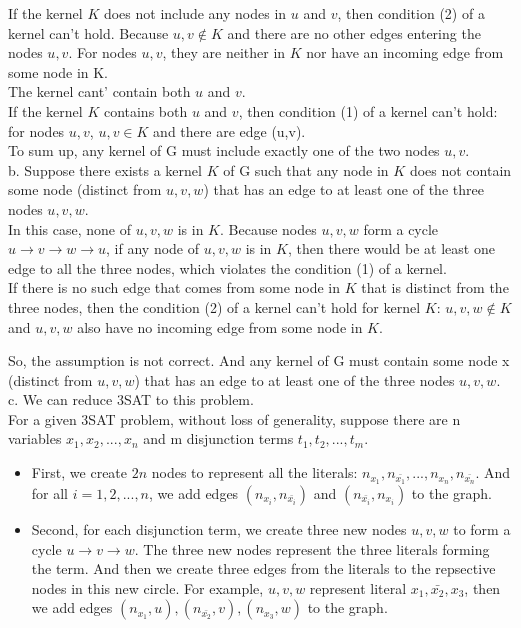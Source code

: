 \documentclass[12pt]{article}
\begin{document}
If the kernel $K$ does not include any nodes in $u$ and $v$, then
condition (2) of a kernel can't hold. Because $u,v \notin K$ and there are no
other edges entering the nodes $u, v$. For nodes $u, v$, they are
neither in $K$ nor have an incoming edge from some node in K. \\

The kernel cant' contain both $u$ and $v$. \\

If the kernel $K$ contains both $u$ and $v$, then condition (1) of a
kernel can't hold: for nodes $u, v$, $u,v \in K$ and there are edge
(u,v). \\ 

To sum up, any kernel of G must include exactly one of the two nodes
$u,v$. \\

b. Suppose there exists a kernel $K$ of G such that any node in $K$
does not contain some node (distinct from $u, v, w$) that has an edge
to at least one of the three nodes $u, v, w$. \\ 

In this case, none of $u, v, w$ is in $K$. Because nodes $u, v, w$
form a cycle $u \to v \to w \to u$, if any node of $u, v, w$ is in
$K$, then there would be at least one edge to all the three nodes,
which violates the condition (1) of a kernel. \\ 

If there is no such edge that comes from some node in $K$ that is
distinct from the three nodes, then the condition (2) of a kernel
can't hold for kernel $K$: $u, v, w \notin K$ and $u, v, w$ also have
no incoming edge from some node in $K$.  

So, the assumption is not correct. And any kernel of G must contain
some node x (distinct from $u, v, w$) that has an edge to at least one
of the three nodes $u, v, w$. \\ 

c. We can reduce 3SAT to this problem. \\

For a given 3SAT problem, without loss of generality, suppose there
are n variables $x_1, x_2, ..., x_n$ and m disjunction terms $t_1,
t_2, ..., t_m$. 

\begin{itemize}
\item First, we create $2n$ nodes to represent all the literals:
  $n_{x_1}, n_{\bar {x_1}}, ..., n_{x_n}, n_{\bar {x_n}}$. And for all
  $i = 1, 2, ..., n$, we add edges $(n_{x_i}, n_{\bar{x_i}})$ and
  $(n_{\bar{x_i}}, n_{x_i})$ to the graph. 
\item Second, for each disjunction term, we create three new nodes $u,
  v, w$ to form a cycle $u \to v \to w$. The three new nodes represent
  the three literals forming the term. And then we create three edges
  from the literals to the repsective nodes in this new circle. For
  example, $u, v, w$ represent literal $x_1, \bar {x_2}, x_3$, then
  we add edges $(n_{x_1}, u), (n_{\bar {x_2}}, v), (n_{x_3}, w)$ to
  the graph.
\end{itemize}
\end{document}

